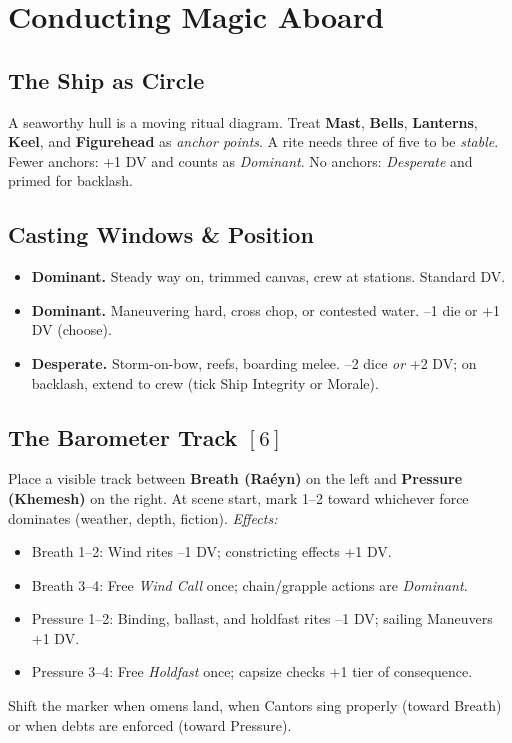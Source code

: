 \documentclass[11pt,oneside]{book}
\begin{document}
\section{Conducting Magic Aboard}

\subsection*{The Ship as Circle}
A seaworthy hull is a moving ritual diagram. Treat \textbf{Mast}, \textbf{Bells}, \textbf{Lanterns}, \textbf{Keel}, and \textbf{Figurehead} as \emph{anchor points}. A rite needs three of five to be \emph{stable}. Fewer anchors: +1 DV and counts as \emph{Dominant}. No anchors: \emph{Desperate} and primed for backlash.

\subsection*{Casting Windows \& Position}
\begin{itemize}[leftmargin=*,itemsep=2pt]
  \item \textbf{Dominant.} Steady way on, trimmed canvas, crew at stations. Standard DV.
  \item \textbf{Dominant.} Maneuvering hard, cross chop, or contested water. --1 die or +1 DV (choose).
  \item \textbf{Desperate.} Storm-on-bow, reefs, boarding melee. --2 dice \emph{or} +2 DV; on backlash, extend to crew (tick Ship Integrity or Morale).
\end{itemize}

\subsection*{The Barometer Track \([6]\)}
Place a visible track between \textbf{Breath (Raéyn)} on the left and \textbf{Pressure (Khemesh)} on the right. At scene start, mark 1--2 toward whichever force dominates (weather, depth, fiction). \emph{Effects:}
\begin{itemize}[leftmargin=*,itemsep=2pt]
  \item Breath 1--2: Wind rites --1 DV; constricting effects +1 DV.
  \item Breath 3--4: Free \emph{Wind Call} once; chain/grapple actions are \emph{Dominant}.
  \item Pressure 1--2: Binding, ballast, and holdfast rites --1 DV; sailing Maneuvers +1 DV.
  \item Pressure 3--4: Free \emph{Holdfast} once; capsize checks +1 tier of consequence.
\end{itemize}
Shift the marker when omens land, when Cantors sing properly (toward Breath) or when debts are enforced (toward Pressure).
\end{document}
